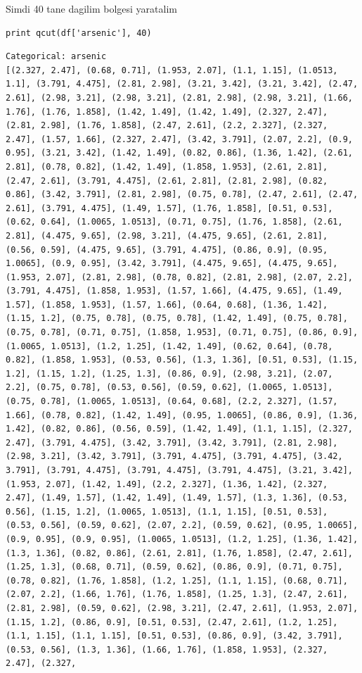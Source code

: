 \documentclass[12pt,fleqn]{article}\usepackage{../common}
\begin{document}
Simdi 40 tane dagilim bolgesi yaratalim

\begin{verbatim}
print qcut(df['arsenic'], 40)
\end{verbatim}

\begin{verbatim}
Categorical: arsenic
[(2.327, 2.47], (0.68, 0.71], (1.953, 2.07], (1.1, 1.15], (1.0513, 1.1], (3.791, 4.475], (2.81, 2.98], (3.21, 3.42], (3.21, 3.42], (2.47, 2.61], (2.98, 3.21], (2.98, 3.21], (2.81, 2.98], (2.98, 3.21], (1.66, 1.76], (1.76, 1.858], (1.42, 1.49], (1.42, 1.49], (2.327, 2.47], (2.81, 2.98], (1.76, 1.858], (2.47, 2.61], (2.2, 2.327], (2.327, 2.47], (1.57, 1.66], (2.327, 2.47], (3.42, 3.791], (2.07, 2.2], (0.9, 0.95], (3.21, 3.42], (1.42, 1.49], (0.82, 0.86], (1.36, 1.42], (2.61, 2.81], (0.78, 0.82], (1.42, 1.49], (1.858, 1.953], (2.61, 2.81], (2.47, 2.61], (3.791, 4.475], (2.61, 2.81], (2.81, 2.98], (0.82, 0.86], (3.42, 3.791], (2.81, 2.98], (0.75, 0.78], (2.47, 2.61], (2.47, 2.61], (3.791, 4.475], (1.49, 1.57], (1.76, 1.858], [0.51, 0.53], (0.62, 0.64], (1.0065, 1.0513], (0.71, 0.75], (1.76, 1.858], (2.61, 2.81], (4.475, 9.65], (2.98, 3.21], (4.475, 9.65], (2.61, 2.81], (0.56, 0.59], (4.475, 9.65], (3.791, 4.475], (0.86, 0.9], (0.95, 1.0065], (0.9, 0.95], (3.42, 3.791], (4.475, 9.65], (4.475, 9.65], (1.953, 2.07], (2.81, 2.98], (0.78, 0.82], (2.81, 2.98], (2.07, 2.2], (3.791, 4.475], (1.858, 1.953], (1.57, 1.66], (4.475, 9.65], (1.49, 1.57], (1.858, 1.953], (1.57, 1.66], (0.64, 0.68], (1.36, 1.42], (1.15, 1.2], (0.75, 0.78], (0.75, 0.78], (1.42, 1.49], (0.75, 0.78], (0.75, 0.78], (0.71, 0.75], (1.858, 1.953], (0.71, 0.75], (0.86, 0.9], (1.0065, 1.0513], (1.2, 1.25], (1.42, 1.49], (0.62, 0.64], (0.78, 0.82], (1.858, 1.953], (0.53, 0.56], (1.3, 1.36], [0.51, 0.53], (1.15, 1.2], (1.15, 1.2], (1.25, 1.3], (0.86, 0.9], (2.98, 3.21], (2.07, 2.2], (0.75, 0.78], (0.53, 0.56], (0.59, 0.62], (1.0065, 1.0513], (0.75, 0.78], (1.0065, 1.0513], (0.64, 0.68], (2.2, 2.327], (1.57, 1.66], (0.78, 0.82], (1.42, 1.49], (0.95, 1.0065], (0.86, 0.9], (1.36, 1.42], (0.82, 0.86], (0.56, 0.59], (1.42, 1.49], (1.1, 1.15], (2.327, 2.47], (3.791, 4.475], (3.42, 3.791], (3.42, 3.791], (2.81, 2.98], (2.98, 3.21], (3.42, 3.791], (3.791, 4.475], (3.791, 4.475], (3.42, 3.791], (3.791, 4.475], (3.791, 4.475], (3.791, 4.475], (3.21, 3.42], (1.953, 2.07], (1.42, 1.49], (2.2, 2.327], (1.36, 1.42], (2.327, 2.47], (1.49, 1.57], (1.42, 1.49], (1.49, 1.57], (1.3, 1.36], (0.53, 0.56], (1.15, 1.2], (1.0065, 1.0513], (1.1, 1.15], [0.51, 0.53], (0.53, 0.56], (0.59, 0.62], (2.07, 2.2], (0.59, 0.62], (0.95, 1.0065], (0.9, 0.95], (0.9, 0.95], (1.0065, 1.0513], (1.2, 1.25], (1.36, 1.42], (1.3, 1.36], (0.82, 0.86], (2.61, 2.81], (1.76, 1.858], (2.47, 2.61], (1.25, 1.3], (0.68, 0.71], (0.59, 0.62], (0.86, 0.9], (0.71, 0.75], (0.78, 0.82], (1.76, 1.858], (1.2, 1.25], (1.1, 1.15], (0.68, 0.71], (2.07, 2.2], (1.66, 1.76], (1.76, 1.858], (1.25, 1.3], (2.47, 2.61], (2.81, 2.98], (0.59, 0.62], (2.98, 3.21], (2.47, 2.61], (1.953, 2.07], (1.15, 1.2], (0.86, 0.9], [0.51, 0.53], (2.47, 2.61], (1.2, 1.25], (1.1, 1.15], (1.1, 1.15], [0.51, 0.53], (0.86, 0.9], (3.42, 3.791], (0.53, 0.56], (1.3, 1.36], (1.66, 1.76], (1.858, 1.953], (2.327, 2.47], (2.327, 
\end{verbatim}
\end{document}
